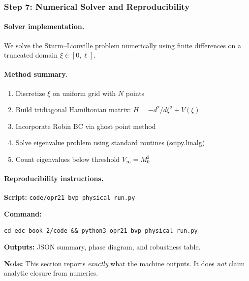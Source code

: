 \subsubsection{Step 7: Numerical Solver and Reproducibility}
\label{subsubsec:opr21_step7}

\paragraph{Solver implementation.}
We solve the Sturm--Liouville problem numerically using finite differences
on a truncated domain $\xi \in [0, \ell]$.

\paragraph{Method summary.}
\begin{enumerate}[nosep]
    \item Discretize $\xi$ on uniform grid with $N$ points
    \item Build tridiagonal Hamiltonian matrix: $H = -d^2/d\xi^2 + V(\xi)$
    \item Incorporate Robin BC via ghost point method
    \item Solve eigenvalue problem using standard routines (scipy.linalg)
    \item Count eigenvalues below threshold $V_\infty = M_0^2$
\end{enumerate}

\paragraph{Reproducibility instructions.}
\begin{tcolorbox}[breakable, enhanced, colback=gray!5!white, colframe=gray!50!black,
    title=\textbf{Reproducibility: Numerical Pipeline}, width=\linewidth]
\textbf{Script:} \texttt{code/opr21\_bvp\_physical\_run.py}

\textbf{Command:}
\begin{verbatim}
cd edc_book_2/code && python3 opr21_bvp_physical_run.py
\end{verbatim}

\textbf{Outputs:} JSON summary, phase diagram, and robustness table.

\textbf{Note:} This section reports \emph{exactly} what the machine outputs.
It does \emph{not} claim analytic closure from numerics.
\end{tcolorbox}

